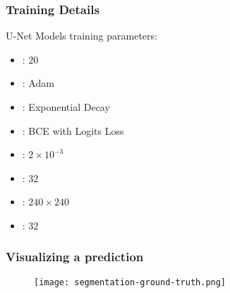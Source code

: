 \documentclass[../presentation.tex]{subfiles} %
\begin{document}
\begin{frame}[t]

	\frametitle{Training Details}

	U-Net Models training parameters:

	\begin{itemize}
		\setlength{\itemsep}{2ex}
		\item {}: $20$
		\item {}: Adam 
		\item {}: Exponential Decay 
		\item {}: BCE with Logits Loss %
		\item {}: $2 \times 10^{-3}$
		\item {}: $32$ 
		\item {}: $240 \times 240$
		\item {}: $32$
	\end{itemize}

\end{frame}


\begin{frame}[t]

	\frametitle{Visualizing a prediction}

	\vspace{-2ex}

		\begin{figure}
			\centering
			\texttt{[image: segmentation-ground-truth.png]}
		\end{figure}

\end{frame}
\end{document}
